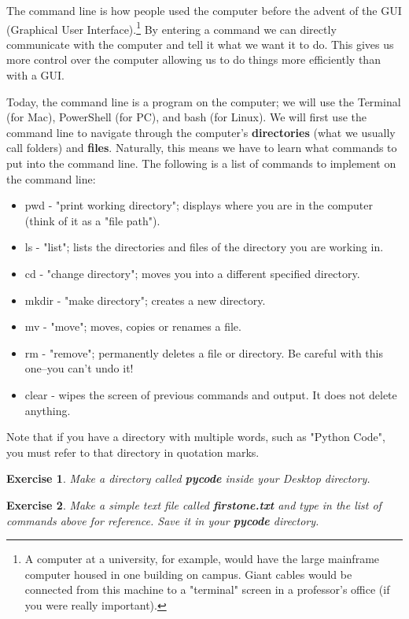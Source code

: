\documentclass[12pt]{amsart}
\newtheorem{quest}{Exercise}
\theoremstyle{definition}
\begin{document}
The command line is how people used the computer before the advent of the GUI (Graphical User Interface).\footnote{A computer at a university, for example, would have the large mainframe computer housed in one building on campus. Giant cables would be connected from this machine to a "terminal" screen in a professor's office (if you were really important).} By entering a command we can directly communicate with the computer and tell it what we want it to do. This gives us more control over the computer allowing us to do things more efficiently than with a GUI.

Today, the command line is a program on the computer; we will use the Terminal (for Mac), PowerShell (for PC), and bash (for Linux). We will first use the command line to navigate through the computer's \textbf{directories} (what we usually call folders) and \textbf{files}. Naturally, this means we have to learn what commands to put into the command line. The following is a list of commands to implement on the command line:

\begin{itemize}
  \item pwd - "print working directory"; displays where you are in the computer (think of it as a "file path").
  \item ls - "list"; lists the directories and files of the directory you are working in.
  \item cd - "change directory"; moves you into a different specified directory. 
  \item mkdir - "make directory"; creates a new directory.
  \item mv - "move"; moves, copies or renames a file.
  \item rm - "remove"; permanently deletes a file or directory. Be careful with this one--you can't undo it!
  \item clear - wipes the screen of previous commands and output. It does not delete anything.
\end{itemize}

Note that if you have a directory with multiple words, such as "Python Code", you must refer to that directory in quotation marks.

\begin{quest}
Make a directory called \textbf{pycode} inside your Desktop directory.
\end{quest}
\begin{quest}
Make a simple text file called \textbf{firstone.txt} and type in the list of commands above for reference. Save it in your \textbf{pycode} directory.
\end{quest}
\end{document}
